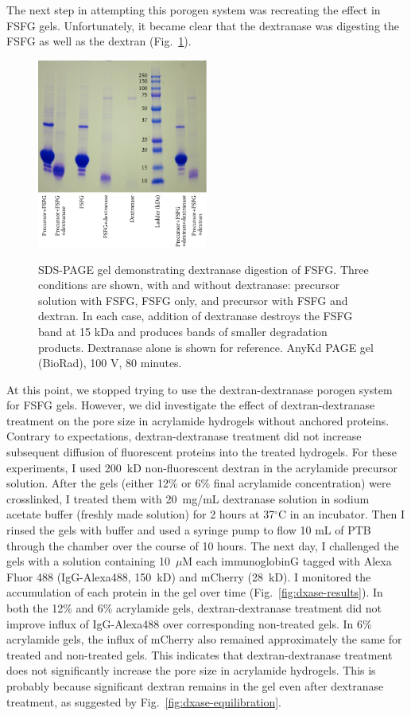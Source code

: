 The next step in attempting this porogen system was recreating the effect in FSFG gels.  Unfortunately, it became clear that the dextranase was digesting the FSFG as well as the dextran (Fig.~\ref{fig:dxase-FSFG}).  
\begin{figure} %
\caption{SDS-PAGE gel demonstrating dextranase digestion of FSFG.  Three conditions are shown, with and without dextranase: precursor solution with FSFG, FSFG only, and precursor with FSFG and dextran.  In each case, addition of dextranase destroys the FSFG band at 15 kDa and produces bands of smaller degradation products.  Dextranase alone is shown for reference.  AnyKd PAGE gel (BioRad), 100 V, 80 minutes.\\}
\centering
\includegraphics[width=0.5\textwidth]{figs/ch03/FSFG+dxase_PAGE}
\label{fig:dxase-FSFG}
\end{figure}
 At this point, we stopped trying to use the dextran-dextranase porogen system for FSFG gels.  However, we did investigate the effect of dextran-dextranase treatment on the pore size in acrylamide hydrogels without anchored proteins.  Contrary to expectations, dextran-dextranase treatment did not increase subsequent diffusion of fluorescent proteins into the treated hydrogels.  For these experiments, I used 200~kD non-fluorescent dextran in the acrylamide precursor solution.  After the gels (either 12\% or 6\% final acrylamide concentration) were crosslinked, I treated them with 20~mg/mL dextranase solution in sodium acetate buffer (freshly made solution) for 2 hours at 37$^\circ$C in an incubator.  Then I rinsed the gels with buffer and used a syringe pump to flow 10 mL of PTB through the chamber over the course of 10 hours. The next day, I challenged the gels with a solution containing 10~$\mu$M each immunoglobinG tagged with Alexa Fluor 488 (IgG-Alexa488, 150~kD) and mCherry (28~kD).  I monitored the accumulation of each protein in the gel over time (Fig.~\ref{fig:dxase-results}).  In both the 12\% and 6\% acrylamide gels, dextran-dextranase treatment did not improve influx of IgG-Alexa488 over corresponding non-treated gels.  In 6\% acrylamide gels, the influx of mCherry also remained approximately the same for treated and non-treated gels.  This indicates that dextran-dextranase treatment does not significantly increase the pore size in acrylamide hydrogels.  This is probably because significant dextran remains in the gel even after dextranase treatment, as suggested by Fig.~\ref{fig:dxase-equilibration}.
